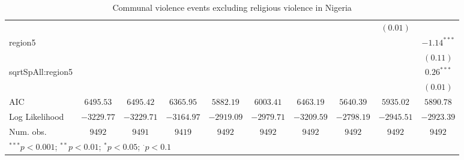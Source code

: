 \begin{sidewaystable}
\begin{center}
{\begin{tabular}{l c c c c c c c c c}
                  &               &               &               &                 &                &               &                 & $(0.01)$      &               \\
region5           &               &               &               &                 &                &               &                 &               & $-1.14^{***}$ \\
                  &               &               &               &                 &                &               &                 &               & $(0.11)$      \\
sqrtSpAll:region5 &               &               &               &                 &                &               &                 &               & $0.26^{***}$  \\
                  &               &               &               &                 &                &               &                 &               & $(0.01)$      \\
\midrule
AIC               & $6495.53$     & $6495.42$     & $6365.95$     & $5882.19$       & $6003.41$      & $6463.19$     & $5640.39$       & $5935.02$     & $5890.78$     \\
Log Likelihood    & $-3229.77$    & $-3229.71$    & $-3164.97$    & $-2919.09$      & $-2979.71$     & $-3209.59$    & $-2798.19$      & $-2945.51$    & $-2923.39$    \\
Num. obs.         & $9492$        & $9491$        & $9419$        & $9492$          & $9492$         & $9492$        & $9492$          & $9492$        & $9492$        \\
\bottomrule
\multicolumn{10}{l}{\scriptsize{$^{***}p<0.001$; $^{**}p<0.01$; $^{*}p<0.05$; $^{\cdot}p<0.1$}}
\end{tabular}
}
\caption{Communal violence events excluding religious violence
	       in Nigeria}
\label{zorg3nigreldif}
\end{center}
\end{sidewaystable}
